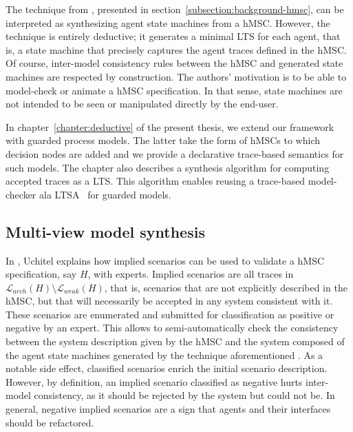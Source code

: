 The technique from \cite{Uchitel:2003}, presented in section~\ref{subsection:background-hmsc}, can be interpreted as synthesizing agent state machines from a hMSC. However, the technique is entirely deductive; it generates a minimal LTS for each agent, that is, a state machine that precisely captures the agent traces defined in the hMSC. Of course, inter-model consistency rules between the hMSC and generated state machines are respected by construction.  The authors' motivation is to be able to model-check or animate a hMSC specification. In that sense, state machines are not intended to be seen or manipulated directly by the end-user.

In chapter~\ref{chapter:deductive} of the present thesis, we extend our framework with guarded process models. The latter take the form of hMSCs to which decision nodes are added and we provide a declarative trace-based semantics for such models. The chapter also describes a synthesis algorithm for computing accepted traces as a LTS. This algorithm enables reusing a trace-based model-checker ala LTSA~\cite{Magee:1999} for guarded models.

\subsection*{Multi-view model synthesis}

In \cite{Uchitel:2004}, Uchitel explains how implied scenarios can be used to validate a hMSC specification, say $H$, with experts. Implied scenarios are all traces in $\mathcal{L}_{arch}(H) \setminus \mathcal{L}_{weak}(H)$, that is, scenarios that are not explicitly described in the hMSC, but that will necessarily be accepted in any system consistent with it. These scenarios are enumerated and submitted for classification as positive or negative by an expert. This allows to semi-automatically check the consistency between the system description given by the hMSC and the system composed of the agent state machines generated by the technique aforementioned \cite{Uchitel:2003}. As a notable side effect, classified scenarios enrich the initial scenario description. However, by definition, an implied scenario classified as negative hurts inter-model consistency, as it should be rejected by the system but could not be. In general, negative implied scenarios are a sign that agents and their interfaces should be refactored. 

